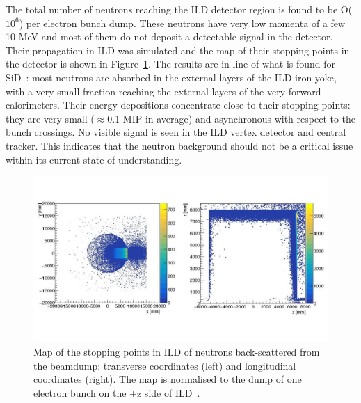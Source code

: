 The total number of neutrons reaching the ILD detector region is found to be O($10^6$) per electron bunch dump. These neutrons have very low momenta of a few 10 MeV and most of them do not deposit a detectable signal in the detector. Their propagation in ILD was simulated and the map of their stopping points in the detector is shown in Figure~\ref{fig:integration:neutrons}. The results are in line of what is found for SiD~\cite{ild:bib:schuetz_thesis}: most neutrons are absorbed in the external layers of the ILD iron yoke, with a very small fraction reaching the external layers of the very forward calorimeters. Their energy depositions concentrate close to their stopping points: they are very small ($\approx$0.1 MIP in average) and asynchronous with respect to the bunch crossings. No visible signal is seen in the ILD vertex detector and central tracker. This indicates that the neutron background should not be a critical issue within its current state of understanding.

\begin{figure}[t!]
\includegraphics[width=1.0\hsize]{Integration/fig/BG_neutrons.jpg}
\caption{\label{fig:integration:neutrons}Map of the stopping points in ILD of neutrons back-scattered from the beamdump: transverse coordinates (left) and longitudinal coordinates (right). The map is normalised to the dump of one electron bunch on the +z side of ILD~\cite{ild:bib:schuetz_thesis}.}
\end{figure}

\vspace{2cm}

